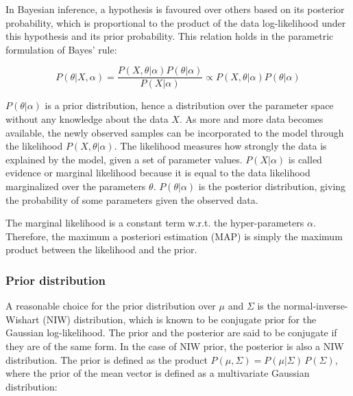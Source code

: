             In Bayesian inference, a hypothesis is favoured over others based on its posterior probability,
            which is proportional to the product of the data log-likelihood under this hypothesis
            and its prior probability. This relation holds in the parametric formulation of Bayes' rule:
            
            \begin{equation}
                P(\theta \vert X, \alpha) = \frac{P(X, \theta \vert \alpha) P(\theta \vert \alpha)}{P(X \vert \alpha)} \propto 
                P(X, \theta \vert \alpha) P(\theta \vert \alpha)
            \end{equation}

            $P(\theta \vert \alpha)$ is a prior distribution, hence a distribution over the parameter space without
            any knowledge about the data $X$. As more and more data becomes available, the newly observed samples can be
            incorporated to the model through the likelihood $P(X, \theta \vert \alpha)$. The likelihood measures how strongly
            the data is explained by the model, given a set of parameter values. $P(X \vert \alpha)$ is called evidence or
            marginal likelihood because it is equal to the data likelihood marginalized over the parameters $\theta$.
            $P(\theta \vert \alpha)$ is the posterior distribution, giving the probability of some parameters given
            the observed data. 

            The marginal likelihood is a constant term w.r.t. the hyper-parameters $\alpha$. Therefore, the maximum
            a posteriori estimation (MAP) is simply the maximum product between the likelihood and the prior.

        \subsubsection{Prior distribution}

            A reasonable choice for the prior distribution over $\mu$ and $\Sigma$ is the normal-inverse-Wishart (NIW)
            distribution, which is known to be conjugate prior for the Gaussian log-likelihood.
            The prior and the posterior are said to be conjugate if they are of the same form. In the case of NIW prior,
            the posterior is also a NIW distribution. The prior is defined as the product
            $P(\mu, \Sigma) = P(\mu \vert \Sigma)\,P(\Sigma)$, where the prior of the mean vector is defined as a multivariate
            Gaussian distribution:

